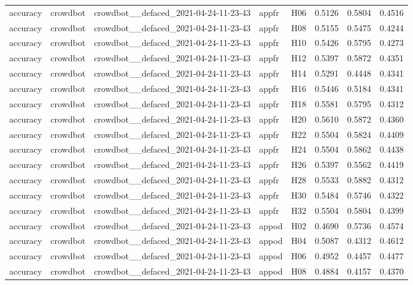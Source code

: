 \begin{table}[tbp]
\begin{tabular}{lllllrrr}
accuracy & crowdbot & crowdbot\_\_defaced\_2021-04-24-11-23-43 & appfr & H06 & 0.5126 & 0.5804 & 0.4516 \\
accuracy & crowdbot & crowdbot\_\_defaced\_2021-04-24-11-23-43 & appfr & H08 & 0.5155 & 0.5475 & 0.4244 \\
accuracy & crowdbot & crowdbot\_\_defaced\_2021-04-24-11-23-43 & appfr & H10 & 0.5426 & 0.5795 & 0.4273 \\
accuracy & crowdbot & crowdbot\_\_defaced\_2021-04-24-11-23-43 & appfr & H12 & 0.5397 & 0.5872 & 0.4351 \\
accuracy & crowdbot & crowdbot\_\_defaced\_2021-04-24-11-23-43 & appfr & H14 & 0.5291 & 0.4448 & 0.4341 \\
accuracy & crowdbot & crowdbot\_\_defaced\_2021-04-24-11-23-43 & appfr & H16 & 0.5446 & 0.5184 & 0.4341 \\
accuracy & crowdbot & crowdbot\_\_defaced\_2021-04-24-11-23-43 & appfr & H18 & 0.5581 & 0.5795 & 0.4312 \\
accuracy & crowdbot & crowdbot\_\_defaced\_2021-04-24-11-23-43 & appfr & H20 & 0.5610 & 0.5872 & 0.4360 \\
accuracy & crowdbot & crowdbot\_\_defaced\_2021-04-24-11-23-43 & appfr & H22 & 0.5504 & 0.5824 & 0.4409 \\
accuracy & crowdbot & crowdbot\_\_defaced\_2021-04-24-11-23-43 & appfr & H24 & 0.5504 & 0.5862 & 0.4438 \\
accuracy & crowdbot & crowdbot\_\_defaced\_2021-04-24-11-23-43 & appfr & H26 & 0.5397 & 0.5562 & 0.4419 \\
accuracy & crowdbot & crowdbot\_\_defaced\_2021-04-24-11-23-43 & appfr & H28 & 0.5533 & 0.5882 & 0.4312 \\
accuracy & crowdbot & crowdbot\_\_defaced\_2021-04-24-11-23-43 & appfr & H30 & 0.5484 & 0.5746 & 0.4322 \\
accuracy & crowdbot & crowdbot\_\_defaced\_2021-04-24-11-23-43 & appfr & H32 & 0.5504 & 0.5804 & 0.4399 \\
accuracy & crowdbot & crowdbot\_\_defaced\_2021-04-24-11-23-43 & appod & H02 & 0.4690 & 0.5736 & 0.4574 \\
accuracy & crowdbot & crowdbot\_\_defaced\_2021-04-24-11-23-43 & appod & H04 & 0.5087 & 0.4312 & 0.4612 \\
accuracy & crowdbot & crowdbot\_\_defaced\_2021-04-24-11-23-43 & appod & H06 & 0.4952 & 0.4457 & 0.4477 \\
accuracy & crowdbot & crowdbot\_\_defaced\_2021-04-24-11-23-43 & appod & H08 & 0.4884 & 0.4157 & 0.4370 \\

\end{tabular}
\end{table}
